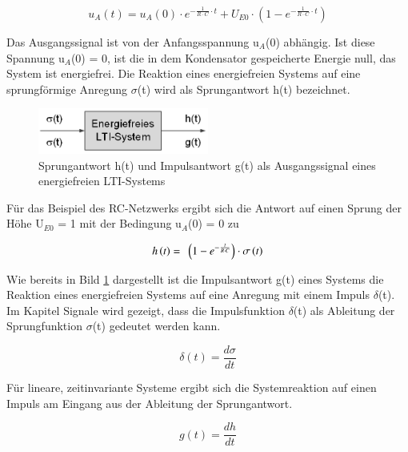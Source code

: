 \begin{equation}\label{eq:threehundredfourtyseven}
u_{A} \left(t\right)=u_{A} \left(0\right)\cdot e^{-\frac{1}{R\cdot C} \cdot t} +U_{E0} \cdot \left(1-e^{-\frac{1}{R\cdot C} \cdot t} \right)
\end{equation}

\noindent Das Ausgangssignal ist von der Anfangsspannung u${}_{A}$(0) abh\"{a}ngig. Ist diese Spannung u${}_{A}$(0) = 0, ist die in dem Kondensator gespeicherte Energie null, das System ist energiefrei. Die Reaktion eines energiefreien Systems auf eine sprungf\"{o}rmige Anregung $\sigma$(t) wird als Sprungantwort h(t) bezeichnet.

\begin{figure}[H]
  \centerline{\includegraphics[width=0.5\textwidth]{Kapitel2/Bilder/image16}}
  \caption{Sprungantwort h(t) und Impulsantwort g(t) als Ausgangssignal eines energiefreien LTI-Systems}
  \label{fig:EnergiefreiLTI}
\end{figure}

\noindent F\"{u}r das Beispiel des RC-Netzwerks ergibt sich die Antwort auf einen Sprung der H\"{o}he U${}_{E0}$ = 1 mit der Bedingung u${}_{A}$(0) = 0 zu 

\begin{equation}\label{eq:threehundredfourtyeight}
h\left(t\right)={\rm \; }\left(1-e^{-\frac{t}{R\cdot C} } \right)\cdot \sigma \left(t\right)
\end{equation}

\noindent Wie bereits in Bild \ref{fig:EnergiefreiLTI} dargestellt ist die Impulsantwort g(t) eines Systems die Reaktion eines energiefreien Systems auf eine Anregung mit einem Impuls $\delta$(t). Im Kapitel Signale wird gezeigt, dass die Impulsfunktion $\delta$(t) als Ableitung der Sprungfunktion $\sigma$(t) gedeutet werden kann. 

\begin{equation}\label{eq:threehundredfourtynine}
\delta \left(t\right)=\frac{d\sigma }{dt}
\end{equation}

\noindent F\"{u}r lineare, zeitinvariante Systeme ergibt sich die Systemreaktion auf einen Impuls am Eingang aus der Ableitung der Sprungantwort.

\begin{equation}\label{eq:threehundredfifty}
g\left(t\right)=\frac{dh}{dt} 
\end{equation}


